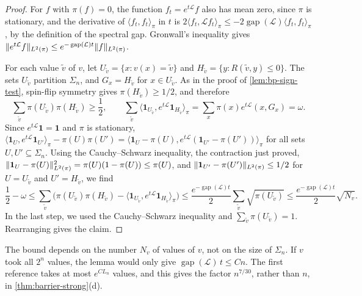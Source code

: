 \begin{proof}
For $f$ with $\pi(f)=0$, the function $f_t=e^{t\mathcal L}f$ also has mean zero, since $\pi$ is stationary, and the derivative of $\langle f_t,f_t\rangle_\pi$ in $t$ is $2\langle f_t,\mathcal Lf_t\rangle_\pi\le-2\operatorname{gap}(\mathcal L)\langle f_t,f_t\rangle_\pi$, by the definition of the spectral gap. Gronwall's inequality gives $\lVert e^{t\mathcal L}f\rVert_{L^2(\pi)}\le e^{-\operatorname{gap}(\mathcal L)t}\lVert f\rVert_{L^2(\pi)}$.

For each value ${\widetilde v}$ of $v$, let $U_{\widetilde v}=\{x:v(x)={\widetilde v}\}$ and $H_{\widetilde v}=\{y:R({\widetilde v},y)\le0\}$. The sets $U_{\widetilde v}$ partition $\Sigma_n$, and $G_x=H_{\widetilde v}$ for $x\in U_{\widetilde v}$. As in the proof of \cref{lem:bp-sign-test}, spin-flip symmetry gives $\pi(H_{\widetilde v})\ge1/2$, and therefore
\[
 \sum_{\widetilde v}\pi(U_{\widetilde v})\pi(H_{\widetilde v})\ge\frac12,\qquad
 \sum_{\widetilde v}\langle\mathbf 1_{U_{\widetilde v}},e^{t\mathcal L}\mathbf 1_{H_{\widetilde v}}\rangle_\pi=\sum_x\pi(x)e^{t\mathcal L}(x,G_x)=\omega.
\]
Since $e^{t\mathcal L}\mathbf 1=\mathbf 1$ and $\pi$ is stationary, $\langle\mathbf 1_{U},e^{t\mathcal L}\mathbf 1_{U'}\rangle_\pi-\pi(U)\pi(U')=\langle\mathbf 1_U-\pi(U),e^{t\mathcal L}(\mathbf 1_{U'}-\pi(U'))\rangle_\pi$ for all sets $U,U'\subseteq\Sigma_n$. Using the Cauchy--Schwarz inequality, the contraction just proved, $\lVert \mathbf 1_U-\pi(U)\rVert_{L^2(\pi)}^2=\pi(U)(1-\pi(U))\le\pi(U)$, and $\lVert \mathbf 1_{U'}-\pi(U')\rVert_{L^2(\pi)}\le1/2$ for $U=U_{\widetilde v}$ and $U'=H_{\widetilde v}$, we find
\[
 \frac12-\omega\le\sum_{\widetilde v}\bigl(\pi(U_{\widetilde v})\pi(H_{\widetilde v})-\langle\mathbf 1_{U_{\widetilde v}},e^{t\mathcal L}\mathbf 1_{H_{\widetilde v}}\rangle_\pi\bigr)
 \le\frac{e^{-\operatorname{gap}(\mathcal L)t}}2\sum_{\widetilde v}\sqrt{\pi(U_{\widetilde v})}\le\frac{e^{-\operatorname{gap}(\mathcal L)t}}2\sqrt{N_v}.
\]
In the last step, we used the Cauchy--Schwarz inequality and $\sum_{\widetilde v}\pi(U_{\widetilde v})=1$. Rearranging gives the claim.
\end{proof}

The bound depends on the number $N_v$ of values of $v$, not on the size of $\Sigma_n$. If $v$ took all $2^n$ values, the lemma would only give $\operatorname{gap}(\mathcal L)\,t\le Cn$. The first reference takes at most $e^{CL_n}$ values, and this gives the factor $n^{7/30}$, rather than $n$, in \cref{thm:barrier-strong}(d).

